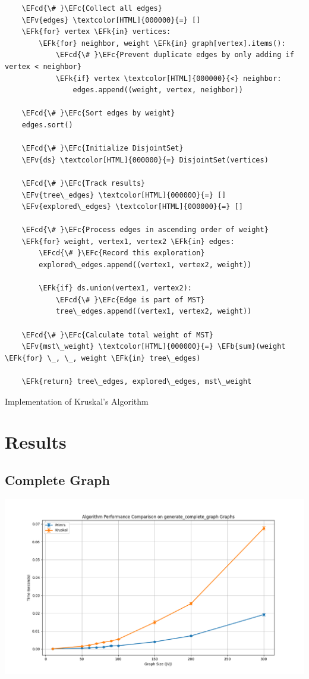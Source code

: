 \documentclass[a4paper,12pt]{article}
\newcommand{\EFc}[1]{\textcolor{EFc}{#1}} %
\newcommand{\EFcd}[1]{\textcolor{EFcd}{#1}} %
\newcommand{\EFk}[1]{\textcolor{EFk}{#1}} %
\newcommand{\EFb}[1]{\textcolor{EFb}{#1}} %
\newcommand{\EFv}[1]{\textcolor{EFv}{#1}} %
\begin{document}
\begin{listing}[htbp]
\begin{Code}
\begin{Verbatim}
    \EFcd{\# }\EFc{Collect all edges}
    \EFv{edges} \textcolor[HTML]{000000}{=} []
    \EFk{for} vertex \EFk{in} vertices:
        \EFk{for} neighbor, weight \EFk{in} graph[vertex].items():
            \EFcd{\# }\EFc{Prevent duplicate edges by only adding if vertex < neighbor}
            \EFk{if} vertex \textcolor[HTML]{000000}{<} neighbor:
                edges.append((weight, vertex, neighbor))

    \EFcd{\# }\EFc{Sort edges by weight}
    edges.sort()

    \EFcd{\# }\EFc{Initialize DisjointSet}
    \EFv{ds} \textcolor[HTML]{000000}{=} DisjointSet(vertices)

    \EFcd{\# }\EFc{Track results}
    \EFv{tree\_edges} \textcolor[HTML]{000000}{=} []
    \EFv{explored\_edges} \textcolor[HTML]{000000}{=} []

    \EFcd{\# }\EFc{Process edges in ascending order of weight}
    \EFk{for} weight, vertex1, vertex2 \EFk{in} edges:
        \EFcd{\# }\EFc{Record this exploration}
        explored\_edges.append((vertex1, vertex2, weight))

        \EFk{if} ds.union(vertex1, vertex2):
            \EFcd{\# }\EFc{Edge is part of MST}
            tree\_edges.append((vertex1, vertex2, weight))

    \EFcd{\# }\EFc{Calculate total weight of MST}
    \EFv{mst\_weight} \textcolor[HTML]{000000}{=} \EFb{sum}(weight \EFk{for} \_, \_, weight \EFk{in} tree\_edges)

    \EFk{return} tree\_edges, explored\_edges, mst\_weight
\end{Verbatim}
\end{Code}
\caption{\label{lst:orgb8883f7}Implementation of Kruskal's Algorithm}
\end{listing}
\section{Results}
\label{sec:org82a1865}
\subsection{Complete Graph}
\label{sec:org082c07d}
\begin{center}
\includegraphics[width=.9\linewidth]{mst_complete.png}
\label{org3a279fe}
\end{center}
\end{document}
